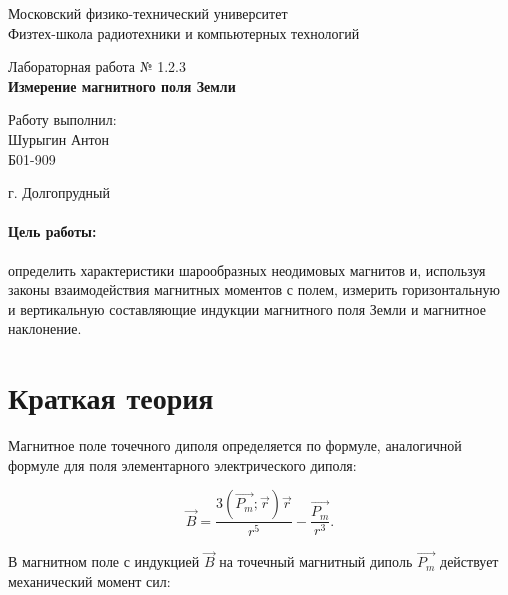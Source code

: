\documentclass[a4paper, 14pt]{extarticle}%
\date{}
\begin{document}
\begin{titlepage}
	\begin{center}
		\large 	Московский физико-технический университет \\
		Физтех-школа радиотехники и компьютерных технологий\\
		\vspace{0.2cm}
		
		\vspace{4.5cm}
		Лабораторная работа № 1.2.3 \\ \vspace{0.2cm}
		\LARGE \textbf{Измерение магнитного поля Земли}
	\end{center}
	\vspace{2.3cm} \large
	
	\begin{center}
		Работу выполнил: \\
		Шурыгин Антон \\
		Б01-909

	\end{center}
	
	\begin{center} \vspace{60mm}
		г. Долгопрудный \\
	\end{center}
\end{titlepage}


\paragraph{Цель работы:}определить характеристики шарообразных неодимовых магнитов и, используя
законы взаимодействия магнитных моментов с полем, измерить горизонтальную и вертикальную
составляющие индукции магнитного поля Земли и магнитное наклонение.
\section{Краткая теория}

Магнитное поле точечного диполя определяется по формуле, аналогичной формуле для поля
элементарного электрического диполя:

\begin{equation}
\vec{B} = \frac{3(\vec{P_m};\vec{r})\vec{r}}{r^5}-\frac{\vec{P_m}}{r^3}.
\end{equation}

В магнитном поле с индукцией $\vec{B}$ на точечный магнитный диполь $\vec{P_m}$ действует механический момент сил:
\end{document}
